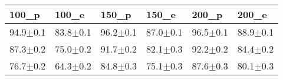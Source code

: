 \begin{tabular}{llllll}
\toprule
100_p & 100_e & 150_p & 150_e & 200_p & 200_e \\
\midrule
94.9$\pm$0.1 & 83.8$\pm$0.1 & 96.2$\pm$0.1 & 87.0$\pm$0.1 & 96.5$\pm$0.1 & 88.9$\pm$0.1 \\
87.3$\pm$0.2 & 75.0$\pm$0.2 & 91.7$\pm$0.2 & 82.1$\pm$0.3 & 92.2$\pm$0.2 & 84.4$\pm$0.2 \\
76.7$\pm$0.2 & 64.3$\pm$0.2 & 84.8$\pm$0.3 & 75.1$\pm$0.3 & 87.6$\pm$0.3 & 80.1$\pm$0.3 \\
\bottomrule
\end{tabular}

